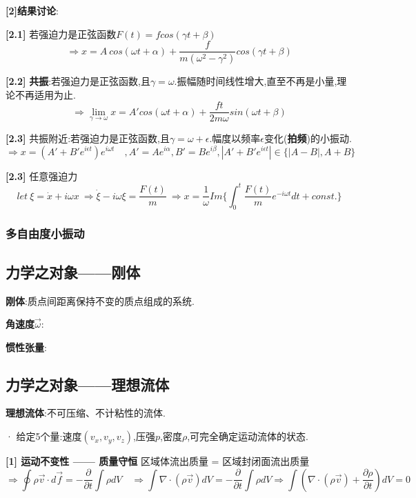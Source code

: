\documentclass{article}
\begin{document}
            \textbf{[2]结果讨论}:
            
            \textbf{[2.1]} 若强迫力是正弦函数$F(t) = f cos(\gamma t + \beta)$
                $$\Rightarrow x = A\ cos(\omega t + \alpha) + \frac{f}{m(\omega^2 - \gamma^2)} cos(\gamma t + \beta)$$
                
            \textbf{[2.2]} \textbf{共振}:若强迫力是正弦函数,且$\gamma = \omega$.\quad 振幅随时间线性增大,直至不再是小量,理论不再适用为止.
            $$\Rightarrow \lim_{\gamma \to \omega}x = A'cos(\omega t + \alpha) + \frac{f t}{2m\omega} sin(\omega t + \beta)$$
            
            \textbf{[2.3]} 共振附近:若强迫力是正弦函数,且$\gamma = \omega + \epsilon$.\quad 幅度以频率$\epsilon$变化(\textbf{拍频})的小振动.
            $$\Rightarrow x = (A' + B' e^{i\epsilon t})e^{i\omega t} \quad ,A' = Ae^{i\alpha},B' = Be^{i\beta},|A' + B' e^{i\epsilon t}| \in \{|A-B|,A+B\} $$
            
            \textbf{[2.3]} 任意强迫力
            $$let\ \xi = \dot x + i\omega x\ \Rightarrow \dot \xi - i\omega \xi = \frac{F(t)}{m}  \ \Rightarrow x = \frac{1}{\omega}Im\{\int_0^t \frac{F(t)}{m}e^{-i\omega t}dt + const.\}$$


        \subsubsection{多自由度小振动}


    \subsection{力学之对象——刚体}
        \textbf{刚体}:质点间距离保持不变的质点组成的系统.
        
        \textbf{角速度$\vec \omega$}:
        
        \textbf{惯性张量}:
    
    
    
    \subsection{力学之对象——理想流体}
        \textbf{理想流体}:不可压缩、不计粘性的流体.
        
        · 给定5个量:速度$(v_x,v_y,v_z)$,压强$p$,密度$\rho$,可完全确定运动流体的状态.
        
        \textbf{[1] 运动不变性 —— 质量守恒}
            区域体流出质量 = 区域封闭面流出质量
            $$\Rightarrow \oint \rho \vec v \cdot d \vec f = -\frac{\partial}{\partial t}\int \rho dV \quad \Rightarrow \int \nabla \cdot (\rho \vec v) dV  = -\frac{\partial}{\partial t}\int \rho dV \Rightarrow  \int (\nabla \cdot (\rho \vec v) + \frac{\partial \rho}{\partial t}) dV  = 0$$
        
\end{document}
